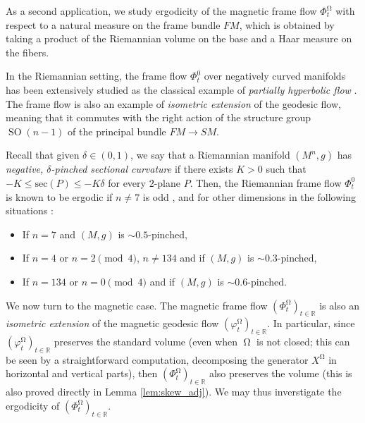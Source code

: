 \documentclass[12pt]{amsart}
\numberwithin{numbering}{section}
\theoremstyle{plain}
\theoremstyle{definition}
\theoremstyle{remark}
\numberwithin{equation}{section}
\DeclareMathOperator{\SO}{SO}
\DeclareMathOperator{\mg}{\Omega}
\newcommand{\R}{\mathbb{R}}
\begin{document}
As a second application, we study ergodicity of the magnetic frame flow $\Phi_t^{\mg}$ with respect to a natural measure on the frame bundle $FM$, which is obtained by taking a product of the Riemannian volume on the base and a Haar measure on the fibers. 

In the Riemannian setting, the frame flow $\Phi_t^0$ over negatively curved manifolds has been extensively studied \cite{brin1974partially,brin1975extensions,brin1980ergodic,brin1982ergodic,brin1984frame, burns2003stable,cekic2024frame,cekic2024unitary,cekic2025pestov,cekic2024semiclassical} as the classical example of \emph{partially hyperbolic flow} \cite{hasselblatt2006partially}. The frame flow is also an example of \emph{isometric extension} of the geodesic flow, meaning that it commutes with the right action of the structure group $\SO(n-1)$ of the principal bundle $FM \to SM$.

Recall that given $\delta \in (0, 1)$, we say that a Riemannian manifold $(M^n, g)$ has \emph{negative, $\delta$-pinched sectional curvature} if there exists $K > 0$ such that $-K \leq \mathrm{sec}(P) \leq - K \delta$ for every $2$-plane $P$. Then, the Riemannian frame flow $\Phi_t^0$ is known to be ergodic if $n \neq 7$ is odd \cite{brin1980ergodic}, and for other dimensions in the following situations \cite{cekic2024frame}:
\begin{itemize}
\item If $n = 7$ and $(M, g)$ is $\sim 0.5$-pinched,
\item If $n = 4$ or $n = 2 \pmod{4}$, $n \neq 134$  and if $(M, g)$ is $\sim 0.3$-pinched,
\item If $n = 134$ or $n = 0 \pmod{4}$ and if $(M, g)$ is $\sim 0.6$-pinched.
\end{itemize}

\smallskip 

We now turn to the magnetic case. The magnetic frame flow $(\Phi_t^{\mg})_{t \in \R}$ is also an \emph{isometric extension} of the magnetic geodesic flow $(\varphi_t^{\mg})_{t \in \R}$. In particular, since $(\varphi_t^{\mg})_{t \in \R}$ preserves the standard volume (even when $\mg$ is not closed; this can be seen by a straightforward computation, decomposing the generator $X^{\mg}$ in horizontal and vertical parts), then $(\Phi_t^{\mg})_{t \in \R}$ also preserves the volume (this is also proved directly in Lemma \ref{lem:skew_adj}). We may thus inverstigate the ergodicity of $(\Phi_t^{\mg})_{t \in \R}$.
\end{document}
